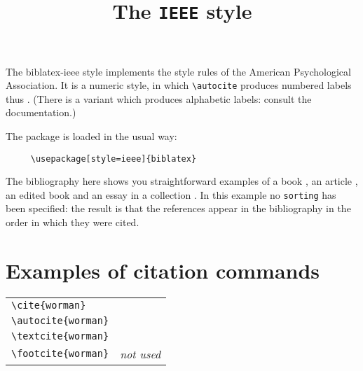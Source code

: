 \documentclass{article}
\begin{document}
\title{The \texttt{IEEE} style}
\author{}\date{}
\maketitle

\thispagestyle{empty}


\noindent The \textsf{biblatex-ieee} style implements the style rules of the American Psychological Association. It is a numeric style, in which \verb~\autocite~ produces numbered labels thus \cite{worman}. (There is a variant which produces alphabetic labels: consult the documentation.)

\quad The package is loaded in the usual way:
\begin{verbatim}
     \usepackage[style=ieee]{biblatex}
\end{verbatim}

The bibliography here shows you straightforward examples of a book \autocite{worman}, an article \autocite{reese}, an edited book \autocite{aristotle:anima} and an essay in a collection \autocite{gaonkar:in}. In this example no \verb~sorting~ has been specified: the result is that the references appear in the bibliography in the order in which they were cited.



\section*{Examples of citation commands}

\begin{tabular}{ll}
\verb|\cite{worman}| & \cite{worman} \\
\verb|\autocite{worman}| & \autocite{worman} \\
\verb|\textcite{worman}| & \textcite{worman} \\
\verb|\footcite{worman}| & \emph{not used}
\end{tabular}


\printbibliography
\end{document}

